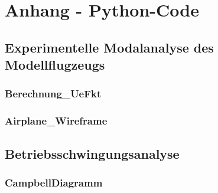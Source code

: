 \chapter*{Anhang - Python-Code}
\label{sec: Anhang}

\appendix

\section{Experimentelle Modalanalyse des Modellflugzeugs}
\label{sec: Anhang_EMA}
    \subsection*{Berechnung\_UeFkt}
        
        \newpage

    \subsection*{Airplane\_Wireframe}
        
        \newpage

\section{Betriebsschwingungsanalyse}
\label{sec: Anhang_BSA}
    \subsection*{CampbellDiagramm}
        
        \newpage